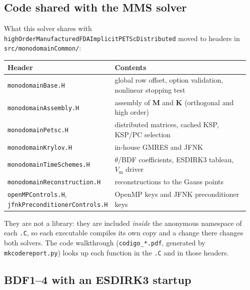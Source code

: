 \documentclass[11pt,a4paper]{article}
\newcommand{\code}[1]{\texttt{\small #1}}
\newcommand{\Vm}{V_{\text{m}}}
\newcommand{\Mmass}{\mathbf{M}}
\newcommand{\Kstif}{\mathbf{K}}
\begin{document}
\subsection{Code shared with the MMS solver}

What this solver shares with \code{highOrderManufacturedFDAImplicitPETScDistributed}
moved to headers in \code{src/monodomainCommon/}:

\begin{center}
\begin{tabular}{@{}p{0.40\linewidth}p{0.56\linewidth}@{}}
\toprule
Header & Contents \\
\midrule
\code{monodomainBase.H} & global row offset, option validation, nonlinear stopping test \\
\code{monodomainAssembly.H} & assembly of $\Mmass$ and $\Kstif$ (orthogonal and high order) \\
\code{monodomainPetsc.H} & distributed matrices, cached KSP, KSP/PC selection \\
\code{monodomainKrylov.H} & in-house GMRES and JFNK \\
\code{monodomainTimeSchemes.H} & $\theta$/BDF coefficients, ESDIRK3 tableau, $\Vm$ driver \\
\code{monodomainReconstruction.H} & reconstructions to the Gauss points \\
\code{openMPControls.H}, \code{jfnkPreconditionerControls.H} & OpenMP keys and JFNK preconditioner keys \\
\bottomrule
\end{tabular}
\end{center}

They are not a library: they are included \emph{inside} the anonymous namespace of
each \code{.C}, so each executable compiles its own copy and a change there changes
both solvers. The code walkthrough (\code{codigo\_*.pdf}, generated by
\code{mkcodereport.py}) looks up each function in the \code{.C} and in those
headers.

\subsection{BDF1--4 with an ESDIRK3 startup}
\label{sec:oct-bdf}
\end{document}
